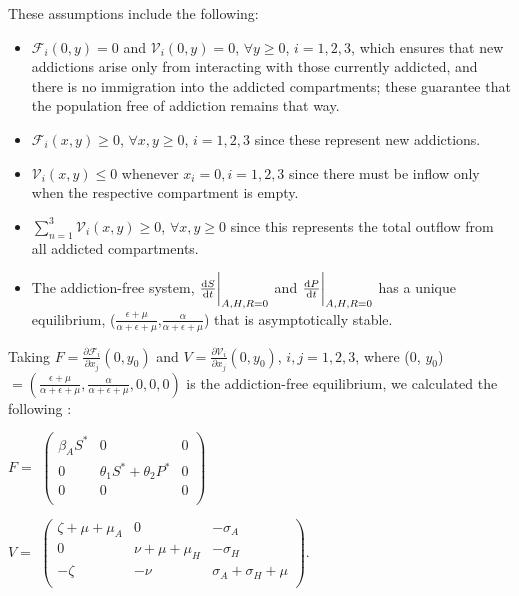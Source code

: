 \documentclass[12pt]{article}
\begin{document}
These assumptions include the following: 
\begin{itemize}
\item $\mathscr{F}_{i} (0,y)=0$ and $\mathscr{V}_{i}(0,y)=0$,  $\forall$$y \geq 0$, $i=1,2,3$, which ensures that new addictions arise only from interacting with those currently addicted, and there is no immigration into the addicted compartments; these guarantee that the population free of addiction remains that way. 
\item $\mathscr{F}_{i} (x,y) \geq 0$, $\forall$$x,y \geq 0$, $i=1,2,3$ since these represent new addictions. 
\item $\mathscr{V}_{i}(x,y) \leq 0$ whenever $x_i=0, i=1,2,3$ since there must be inflow only when the respective compartment is empty. 
\item $\sum_{n=1}^{3} \mathscr{V}_{i}(x,y) \geq 0$, $\forall x,y \geq 0$ since this represents the total outflow from all addicted compartments. 
\item The addiction-free system, $\dv{S}{t}\bigg|_{A,H,R=0}$ and $\dv{P}{t}\bigg|_{A,H,R=0}$ has a unique equilibrium, ($\frac{\epsilon+\mu}{\alpha+\epsilon+\mu}$,$\frac{\alpha}{\alpha+\epsilon+\mu}$) that is asymptotically stable. 
\end{itemize}

Taking $F=\frac{\partial \mathscr{F}_i}{\partial x_j} (0, y_0)$ and $V=\frac{\partial \mathscr{V}_i}{\partial x_j} (0, y_0)$, $i, j =1, 2, 3$, where (0, $y_{0}$) $=(\frac{\epsilon + \mu}{\alpha + \epsilon +\mu},\frac{\alpha}{\alpha + \epsilon +\mu},0,0,0)$ is the addiction-free equilibrium, we calculated the following \cite{Driessche}: 



\begin{center}
$F=$
$ \begin{pmatrix}

\beta_{A} S^* &  0  & 0 \\
0 & \theta_1 S^* +\theta_2 P^* & 0\\
0  &   0 & 0\\
\end{pmatrix}$



$V=$
$ \begin{pmatrix}

\zeta +\mu +\mu_A &  0  & -\sigma_A \\
0 &  \nu+\mu+\mu_H & -\sigma_H\\
-\zeta& -\nu  & \sigma_A + \sigma_H + \mu\\

\end{pmatrix}$.
\end{center}
\end{document}
